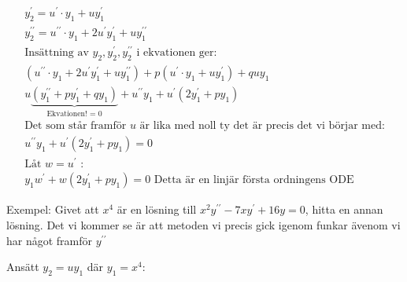 \begin{equation*}
  \begin{gathered}
    y_{2}^{\prime}=u^{\prime}\cdot y_1+uy_{1}^{\prime}\\
    y_{2}^{\prime\prime}= u^{\prime\prime}\cdot y_1+2u^{\prime}y_{1}^{\prime}+uy_{1}^{\prime\prime}\\
    \text{Insättning av $y_2, y_2^{\prime}, y_2^{\prime\prime}$ i ekvationen ger: }\\
    (u^{\prime\prime}\cdot y_1+2u^{\prime}y_{1}^{\prime}+uy_{1}^{\prime\prime})+p(u^{\prime}\cdot y_1+uy_{1}^{\prime}) +quy_1\\
    u\underbrace{(y_{1}^{\prime\prime}+py_{1}^{\prime}+qy_1)}_{\text{Ekvationen! = 0}}+u^{\prime\prime}y_1+u^{\prime}(2y_{1}^{\prime}+py_1)\\
    \text{Det som står framför $u$ är lika med noll ty det är precis det vi börjar med:}\\
    u^{\prime\prime}y_1+u^{\prime}(2y_{1}^{\prime}+py_1)=0\\
    \text{Låt } w=u^{\prime} \text{ :}\\
    y_1w^{\prime}+w(2y_{1}^{\prime}+py_1)=0 \text{ Detta är en linjär första ordningens ODE}
  \end{gathered}
\end{equation*}
\par\bigskip

\noindent Exempel: Givet att $x^4$ är en lösning till $x^2y^{\prime\prime}-7xy^{\prime}+16y=0$, hitta en annan lösning. Det vi kommer se är att metoden vi precis gick igenom funkar ävenom vi har något framför $y^{\prime\prime}$
\par\bigskip
\noindent Ansätt $y_2=uy_1$ där $y_1=x^4$:


